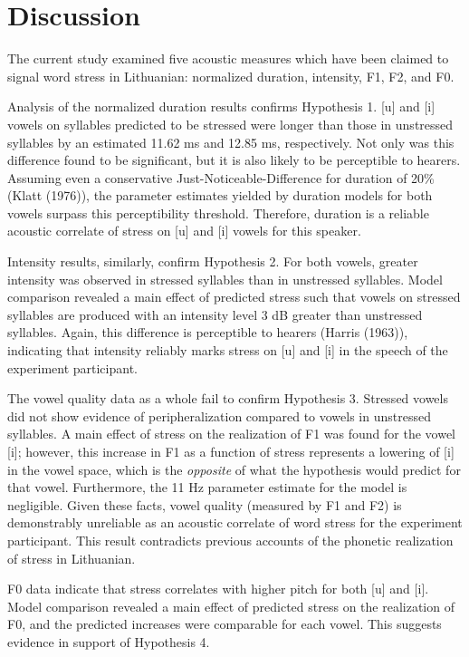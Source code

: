 \documentclass[english,man]{apa6}
\theoremstyle{definition}
\theoremstyle{definition}
\theoremstyle{definition}
\theoremstyle{remark}
\begin{document}
\section{Discussion}\label{discussion}

The current study examined five acoustic measures which have been
claimed to signal word stress in Lithuanian: normalized duration,
intensity, F1, F2, and F0.

Analysis of the normalized duration results confirms Hypothesis 1.
{[}u{]} and {[}i{]} vowels on syllables predicted to be stressed were
longer than those in unstressed syllables by an estimated 11.62 ms and
12.85 ms, respectively. Not only was this difference found to be
significant, but it is also likely to be perceptible to hearers.
Assuming even a conservative Just-Noticeable-Difference for duration of
20\% (Klatt (1976)), the parameter estimates yielded by duration models
for both vowels surpass this perceptibility threshold. Therefore,
duration is a reliable acoustic correlate of stress on {[}u{]} and
{[}i{]} vowels for this speaker.

Intensity results, similarly, confirm Hypothesis 2. For both vowels,
greater intensity was observed in stressed syllables than in unstressed
syllables. Model comparison revealed a main effect of predicted stress
such that vowels on stressed syllables are produced with an intensity
level 3 dB greater than unstressed syllables. Again, this difference is
perceptible to hearers (Harris (1963)), indicating that intensity
reliably marks stress on {[}u{]} and {[}i{]} in the speech of the
experiment participant.

The vowel quality data as a whole fail to confirm Hypothesis 3. Stressed
vowels did not show evidence of peripheralization compared to vowels in
unstressed syllables. A main effect of stress on the realization of F1
was found for the vowel {[}i{]}; however, this increase in F1 as a
function of stress represents a lowering of {[}i{]} in the vowel space,
which is the \emph{opposite} of what the hypothesis would predict for
that vowel. Furthermore, the 11 Hz parameter estimate for the model is
negligible. Given these facts, vowel quality (measured by F1 and F2) is
demonstrably unreliable as an acoustic correlate of word stress for the
experiment participant. This result contradicts previous accounts of the
phonetic realization of stress in Lithuanian.

F0 data indicate that stress correlates with higher pitch for both
{[}u{]} and {[}i{]}. Model comparison revealed a main effect of
predicted stress on the realization of F0, and the predicted increases
were comparable for each vowel. This suggests evidence in support of
Hypothesis 4.
\end{document}

